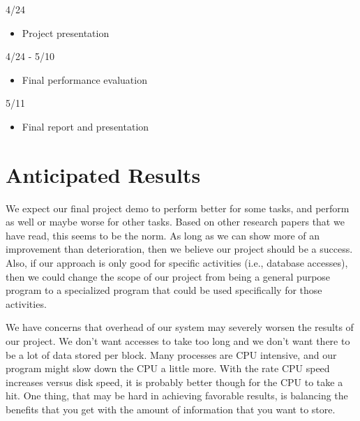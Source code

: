 \documentclass[letterpaper,twocolumn,10pt]{article}
\begin{document}
\begin{description}
\item[4/24]
\end{description}
\begin{itemize}
\item Project presentation
\end{itemize}

\begin{description}
\item[4/24 - 5/10]
\end{description}
\begin{itemize}
\item Final performance evaluation
\end{itemize}

\begin{description}
\item[5/11]
\end{description}
\begin{itemize}
\item Final report and presentation 
\end{itemize}

\section{Anticipated Results}

We expect our final project demo to perform better for some tasks, and perform as well or maybe worse for other tasks.  Based on other research papers that we have read, this seems to be the norm.  As long as we can show more of an improvement than deterioration, then we believe our project should be a success.  Also, if our approach is only good for specific activities (i.e., database accesses), then we could change the scope of our project from being a general purpose program to a specialized program that could be used specifically for those activities.

We have concerns that overhead of our system may severely worsen the results of our project.  We don't want accesses to take too long and we don't want there to be a lot of data stored per block.  Many processes are CPU intensive, and our program might slow down the CPU a little more.  With the rate CPU speed increases versus disk speed, it is probably better though for the CPU to take a hit.  One thing, that may be hard in achieving favorable results, is balancing the benefits that you get with the amount of information that you want to store.
\end{document}
